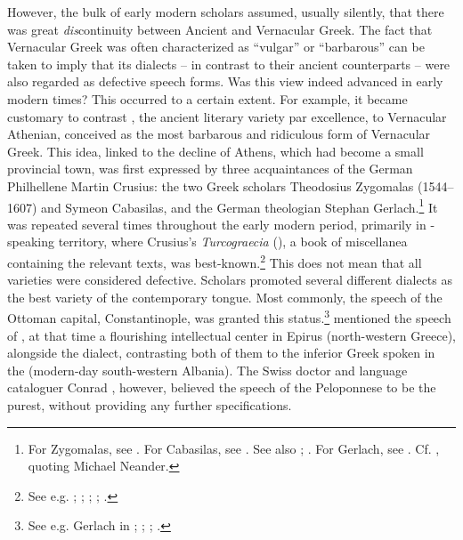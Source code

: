However, the bulk of early modern scholars assumed, usually silently, that there was great \textit{dis}continuity between Ancient and Vernacular Greek. The fact that Vernacular Greek was often characterized as “vulgar” or “barbarous” can be taken to imply that its dialects – in contrast to their ancient counterparts – were also regarded as defective speech forms. Was this view indeed advanced in early modern times? This occurred to a certain extent. For example, it became customary to contrast , the ancient literary variety par excellence, to Vernacular Athenian, conceived as the most barbarous and ridiculous form of Vernacular Greek. This idea, linked to the decline of Athens, which had become a small provincial town, was first expressed by three acquaintances of the German Philhellene Martin Crusius: the two Greek scholars Theodosius Zygomalas (1544–1607) and Symeon Cabasilas, and the German theologian Stephan Gerlach.\footnote{For Zygomalas, see \citet[99, 216]{Crusius1584}. For Cabasilas, see \citet[461]{Crusius1584}. See also \citet[91]{Rotolo1973}; \citet[185, 189–190]{Rhoby2002}. For Gerlach, see \citet[489]{Crusius1584}. Cf. \citet[194]{Ben-tov2013}, quoting Michael Neander.} It was repeated several times throughout the early modern period, primarily in -speaking territory, where Crusius’s \textit{Turcograecia} (\citeyear{Crusius1584}), a book of miscellanea containing the relevant texts, was best-known.\footnote{See e.g. \citet[215]{Becman1673}; \citet[\textsc{a.3}\textsc{\textsuperscript{v}}]{Rodigast1685}; \citet[\textsc{ii}.824]{Hofmann1698}; \citet[1135]{[frisch]1730}; \citet[9]{Gedike1782}.} This does not mean that all  varieties were considered defective. Scholars promoted several different dialects as the best variety of the contemporary tongue. Most commonly, the speech of the Ottoman capital, Constantinople, was granted this status.\footnote{See e.g. Gerlach in \citet[489]{Crusius1584}; \citet[215]{Becman1673}; \citet[74]{Blount1680}; \citet[vii]{Du1688}.} \citet[a.4\textsc{\textsuperscript{v}}, a.7\textsc{\textsuperscript{r}}]{Tribbechow1705} mentioned the speech of , at that time a flourishing intellectual center in Epirus (north-western Greece), alongside the  dialect, contrasting both of them to the inferior Greek spoken in the  (modern-day south-western Albania). The Swiss doctor and language cataloguer Conrad \citet[47\textsc{\textsuperscript{r}}]{Gessner1555}, however, believed the speech of the Peloponnese to be the purest, without providing any further specifications.

